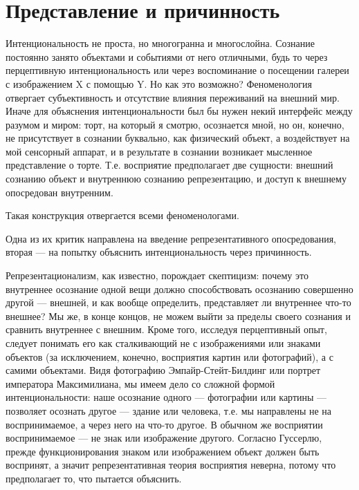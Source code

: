 \documentclass[11pt]{book}
\begin{document}
\section{Представление и причинность}

Интенциональность не проста, но многогранна и многослойна. Сознание постоянно занято объектами и событиями от него отличными, будь то через перцептивную интенциональность или через воспоминание о посещении галереи с изображением X с помощью Y. Но как это возможно? Феноменология отвергает субъективность и отсутствие влияния переживаний на внешний мир. Иначе для объяснения интенциональности был бы нужен некий интерфейс между разумом и миром: торт, на который я смотрю, осознается мной, но он, конечно, не присутствует в сознании буквально, как физический объект, а воздействует на мой сенсорный аппарат, и в результате в сознании возникает мысленное представление о торте. Т.е. восприятие предполагает две сущности: внешний сознанию объект и внутреннюю сознанию репрезентацию, и доступ к внешнему опосредован внутренним.

Такая конструкция отвергается всеми феноменологами.

Одна из их критик направлена на введение репрезентативного опосредования, вторая --- на попытку объяснить интенциональность через причинность.

Репрезентационализм, как известно, порождает скептицизм: почему это внутреннее осознание одной вещи должно способствовать осознанию совершенно другой --- внешней, и как вообще определить, представляет ли внутреннее что-то внешнее? Мы же, в конце концов, не можем выйти за пределы своего сознания и сравнить внутреннее с внешним. Кроме того, исследуя перцептивный опыт, следует понимать его как сталкивающий не с изображениями или знаками объектов (за исключением, конечно, восприятия картин или фотографий), а с самими объектами. Видя фотографию Эмпайр-Стейт-Билдинг или портрет императора Максимилиана, мы имеем дело со сложной формой интенциональности: наше осознание одного --- фотографии или картины --- позволяет осознать другое --- здание или человека, т.е. мы направлены не на воспринимаемое, а через него на что-то другое. В обычном же восприятии воспринимаемое --- не знак или изображение другого. Согласно Гуссерлю, прежде функционирования знаком или изображением объект должен быть воспринят, а значит репрезентативная теория восприятия неверна, потому что предполагает то, что пытается объяснить.
\end{document}
